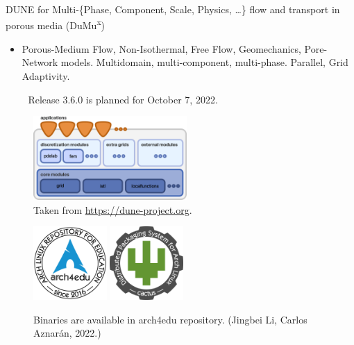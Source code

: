 \begin{frame}
\begin{alertblock}{DUNE for Multi-\{Phase, Component, Scale, Physics, \ldots\} flow and transport in porous media (DuMu\textsuperscript{x})}
\begin{itemize}
			      {🎉}
			      DUNE Release 2.9.0 is planned for end of October 2022.

			\item

			      Porous-Medium Flow, Non-Isothermal, Free Flow, Geomechanics, Pore-Network models.
			      Multidomain, multi-component, multi-phase. Parallel, Grid Adaptivity.

				      {🎉}
			      Release 3.6.0 is planned for October 7, 2022.

		\end{itemize}
	\end{alertblock}

	\begin{minipage}{0.45\textwidth}
		\begin{figure}[ht!]
			\centering
			\includegraphics[height=3.2cm]{dunedesign}
			\caption{Taken from \url{https://dune-project.org}.}
		\end{figure}
	\end{minipage}\qquad\qquad
	\begin{minipage}{0.45\textwidth}
		\begin{figure}[ht!]
			\centering %
			\href{https://github.com/arch4edu/arch4edu}{\includegraphics[height=2.8cm]{arch4edu}}\quad\quad %
			\href{https://github.com/arch4edu/cactus}{\includegraphics[height=2.8cm]{cactus.png}}
			\caption{Binaries are available in \alert{arch4edu repository}. (Jingbei Li, Carlos Aznarán, 2022.)}
		\end{figure}
	\end{minipage}

\end{frame}


